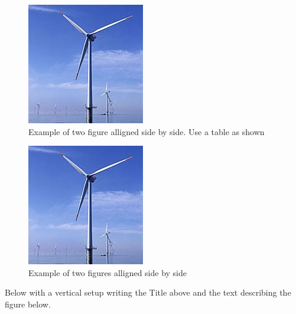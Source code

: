 \begin{minipage}{0.5\textwidth}

\begin{figure}[H]
	\includegraphics[scale=1]{figures/windmill.png}
	\caption{Example of two figure alligned side by side. Use a table as shown }
\end{figure}
\end{minipage} \hfill
\begin{minipage}{0.47\textwidth}
\begin{figure}[H]
	\includegraphics[scale=1]{figures/windmill.png}
	\caption{Example of two figures alligned side by side}
\end{figure}

\end{minipage}

Below with a vertical setup writing the Title above and the text describing the figure below.